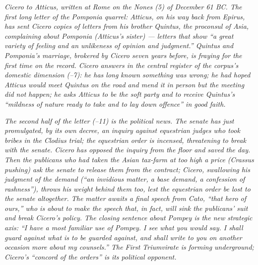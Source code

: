 
\textit{Cicero to Atticus, written at Rome on the Nones (5)
of December 61 BC. The first long letter of the Pomponia
quarrel: Atticus, on his way back from Epirus, has sent
Cicero copies of letters from his brother Quintus, the
proconsul of Asia, complaining about Pomponia (Atticus's
sister) --- letters that show ``a great variety of feeling
and an unlikeness of opinion and judgment.'' Quintus and
Pomponia's marriage, brokered by Cicero seven years before,
is fraying for the first time on the record. Cicero answers
in the central register of the corpus's domestic dimension
(--7): he has long known something was wrong;
he had hoped Atticus would meet Quintus on the road and
mend it in person but the meeting did not happen; he asks
Atticus to be the soft party and to receive Quintus's
``mildness of nature ready to take and to lay down offence''
in good faith.}

\textit{The second half of the letter (--11)
is the political news. The senate has just promulgated, by
its own decree, an inquiry against equestrian judges who
took bribes in the Clodius trial; the equestrian order is
incensed, threatening to break with the senate. Cicero has
opposed the inquiry from the floor and saved the day. Then
the publicans who had taken the Asian tax-farm at too high
a price (Crassus pushing) ask the senate to release them
from the contract; Cicero, swallowing his judgment of the
demand (``an invidious matter, a base demand, a confession
of rashness''), throws his weight behind them too, lest the
equestrian order be lost to the senate altogether. The
matter awaits a final speech from Cato, ``that hero of
ours,'' who is about to make the speech that, in fact, will
sink the publicans' suit and break Cicero's policy. The
closing sentence about Pompey is the new strategic axis:
``I have a most familiar use of Pompey. I see what you
would say. I shall guard against what is to be guarded
against, and shall write to you on another occasion more
about my counsels.'' The First Triumvirate is forming
underground; Cicero's ``concord of the orders'' is its
political opponent.}
